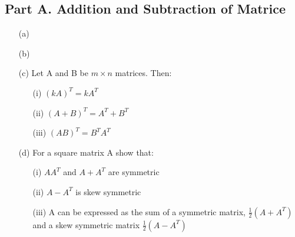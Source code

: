 \documentclass[12pt,a4paper]{article}
\begin{document}
\subsection*{Part A. Addition and Subtraction of Matrice}
\begin{itemize}
	\item[(a)] 
\item[(b)]

	
		
		\item[(c)] Let A and B be $m \times n$ matrices. Then:
		
		\begin{itemize}
			\item[(i)] $(kA)^T = kA^T$
			\item[(ii)] $(A+B)^T = A^T + B^T$
			\item[(iii)] $(AB)^T = B^TA^T$
		\end{itemize}
		
		
\item[(d)]For a square matrix A show that:
		
		\begin{itemize}
			\item[(i)] $AA^T$ and $A+A^T$ are symmetric
			\item[(ii)] $A-A^T$ is skew symmetric
			\item[(iii)] A can be expressed as the sum of a symmetric matrix, $\frac{1}{2}(A+A^T)$ and a skew 
			symmetric matrix $\frac{1}{2}(A-A^T)$
		\end{itemize}
		\end{itemize}
		

	
\vfill
\end{document}
